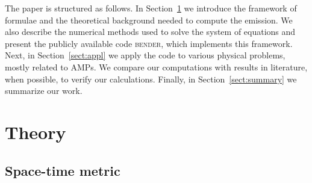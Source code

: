 \documentclass{aa}
\begin{document}
The paper is structured as follows.
In Section~\ref{sect:theory} we introduce the framework of formulae and the theoretical background needed to compute the emission.
We also describe the numerical methods used to solve the system of equations and present the publicly available code \textsc{bender},%
which implements this framework.
Next, in Section~\ref{sect:appl} we apply the code to various physical problems, mostly related to AMPs.
We compare our computations with results in literature, when possible, to verify our calculations.
Finally, in Section~\ref{sect:summary} we summarize our work.




\section{Theory}\label{sect:theory}
\subsection{Space-time metric}\label{sect:spacetime}
\end{document}
